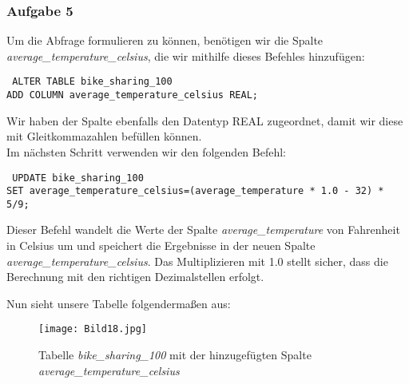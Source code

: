 \documentclass[a4paper, 12pt]{article}
\begin{document}
\newpage

\subsubsection{Aufgabe 5}
{\fontsize{12}{15}\selectfont
Um die Abfrage formulieren zu können, benötigen wir die Spalte \textit{average\_temperature\_celsius}, die wir mithilfe dieses Befehles hinzufügen:

\vspace{\baselineskip}
{\fontsize{10}{12}\selectfont
\texttt{%
ALTER TABLE bike\_sharing\_100 \\
ADD COLUMN average\_temperature\_celsius REAL;
}}

\vspace{\baselineskip}

Wir haben der Spalte ebenfalls den Datentyp REAL zugeordnet, damit wir diese mit Gleitkommazahlen befüllen können. \\ Im nächsten Schritt verwenden wir den folgenden Befehl:

\vspace{\baselineskip}
{\fontsize{10}{12}\selectfont
\texttt{%
UPDATE bike\_sharing\_100 \\
SET average\_temperature\_celsius=(average\_temperature * 1.0 - 32) * 5/9;
}}

\vspace{\baselineskip}

Dieser Befehl wandelt die Werte der Spalte \textit{average\_temperature} von Fahrenheit in Celsius um und speichert die Ergebnisse in der neuen Spalte \textit{average\_temperature\_celsius}. Das Multiplizieren mit 1.0 stellt sicher, dass die Berechnung mit den richtigen Dezimalstellen erfolgt. 

Nun sieht unsere Tabelle folgendermaßen aus:}

\vspace{\baselineskip}

\begin{figure}[ht]
    \centering
     \texttt{[image: Bild18.jpg]}  
     \par Tabelle \textit{bike\_sharing\_100} mit der hinzugefügten Spalte \textit{average\_temperature\_celsius} 
\end{figure}

\vspace{\baselineskip}
\end{document}

